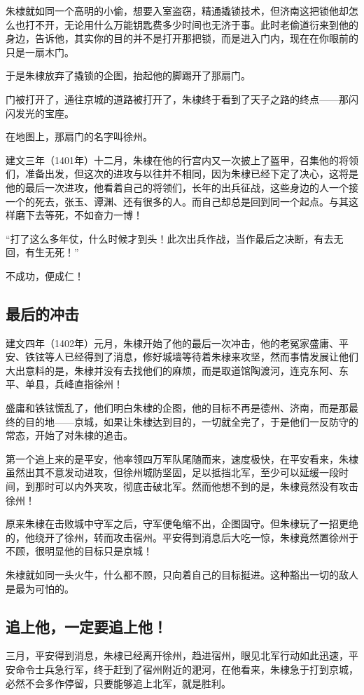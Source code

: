 \begin{multicols}{\theparacolNo}
		朱棣就如同一个高明的小偷，想要入室盗窃，精通撬锁技术，但济南这把锁他却怎么也打不开，无论用什么万能钥匙费多少时间也无济于事。此时老偷道衍来到他的身边，告诉他，其实你的目的并不是打开那把锁，而是进入门内，现在在你眼前的只是一扇木门。

		于是朱棣放弃了撬锁的企图，抬起他的脚踢开了那扇门。

		门被打开了，通往京城的道路被打开了，朱棣终于看到了天子之路的终点——那闪闪发光的宝座。

		在地图上，那扇门的名字叫徐州。

		建文三年（1401年）十二月，朱棣在他的行宫内又一次披上了盔甲，召集他的将领们，准备出发，但这次的进攻与以往并不相同，因为朱棣已经下定了决心，这将是他的最后一次进攻，他看着自己的将领们，长年的出兵征战，这些身边的人一个接一个的死去，张玉、谭渊、还有很多的人。而自己却总是回到同一个起点。与其这样磨下去等死，不如奋力一博！

		“打了这么多年仗，什么时候才到头！此次出兵作战，当作最后之决断，有去无回，有生无死！”

		不成功，便成仁！

		\subsection{最后的冲击}
		建文四年（1402年）元月，朱棣开始了他的最后一次冲击，他的老冤家盛庸、平安、铁铉等人已经得到了消息，修好城墙等待着朱棣来攻坚，然而事情发展让他们大出意料的是，朱棣并没有去找他们的麻烦，而是取道馆陶渡河，连克东阿、东平、单县，兵峰直指徐州！

		盛庸和铁铉慌乱了，他们明白朱棣的企图，他的目标不再是德州、济南，而是那最终的目的地——京城，如果让朱棣达到目的，一切就全完了，于是他们一反防守的常态，开始了对朱棣的追击。

		第一个追上来的是平安，他率领四万军队尾随而来，速度极快，在平安看来，朱棣虽然出其不意发动进攻，但徐州城防坚固，足以抵挡北军，至少可以延缓一段时间，到那时可以内外夹攻，彻底击破北军。然而他想不到的是，朱棣竟然没有攻击徐州！

		原来朱棣在击败城中守军之后，守军便龟缩不出，企图固守。但朱棣玩了一招更绝的，他绕开了徐州，转而攻击宿州。平安得到消息后大吃一惊，朱棣竟然置徐州于不顾，很明显他的目标只是京城！

		朱棣就如同一头火牛，什么都不顾，只向着自己的目标挺进。这种豁出一切的敌人是最为可怕的。

		\subsection{追上他，一定要追上他！}
		三月，平安得到消息，朱棣已经离开徐州，趋进宿州，眼见北军行动如此迅速，平安命令士兵急行军，终于赶到了宿州附近的淝河，在他看来，朱棣急于打到京城，必然不会多作停留，只要能够追上北军，就是胜利。


\end{multicols}
